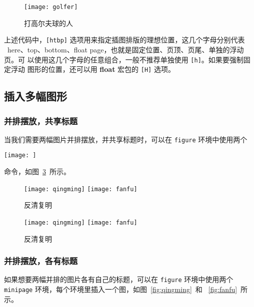 \begin{latex}
\begin{figure}[htbp]
\centering
\texttt{[image: golfer]}
\caption{打高尔夫球的人}
\label{fig:golfer}%
\end{figure}
\end{latex}

上述代码中，\verb|[htbp]| 选项用来指定插图排版的理想位置，这几个字母分别代表
~here、top、bottom、float page，也就是固定位置、页顶、页尾、单独的浮动页。可
以使用这几个字母的任意组合，一般不推荐单独使用 \verb|[h]|。如果要强制固定浮动
图形的位置，还可以用 \textbf{float} 宏包的 \verb|[H]| 选项。

\subsection{插入多幅图形}

\subsubsection*{并排摆放，共享标题}

当我们需要两幅图片并排摆放，并共享标题时，可以在 \texttt{figure} 环境中使用两个
\begin{latex}
\texttt{[image: ]}
\end{latex}
命令，如图~\ref{fig:fanqingfuming}~所示。

\begin{latex}
\begin{figure}[htbp]
\centering
\texttt{[image: qingming]}
\hspace{36pt}
\texttt{[image: fanfu]}
\caption{反清复明}
\label{fig:fanqingmuming}
\end{figure}
\end{latex}

\begin{figure}[htbp]
\centering
\texttt{[image: qingming]}
\hspace{36pt}
\texttt{[image: fanfu]}
\caption{反清复明}
\label{fig:fanqingfuming}
\end{figure}

\subsubsection*{并排摆放，各有标题}

如果想要两幅并排的图片各有自己的标题，可以在 \texttt{figure} 环境中使用两个
 \texttt{minipage} 环境，每个环境里插入一个图，如图~\ref{fig:qingming}~和
~\ref{fig:fanfu}~所示。

